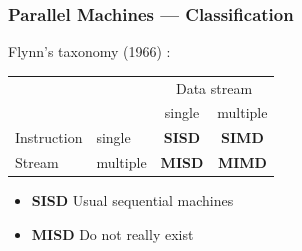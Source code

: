 \documentclass[xcolor={x11names,svgnames,psnames}]{beamer}
\begin{document}


\begin{frame}
\frametitle{Parallel Machines --- Classification}

\begin{block}{Flynn's taxonomy (1966) :}

  \begin{center}
    \begin{tabular}{|l|l|c|c|}
      \cline{3-4}
      \multicolumn{2}{c|}{}   & \multicolumn{2}{c|}{Data stream} \\
      \cline{3-4}
      \multicolumn{2}{c|}{}   & single & multiple \\
      \hline
      Instruction             & single   & \bf SISD   & \bf SIMD \\
      \cline{2-4}
      Stream                  & multiple   & \bf MISD   & \bf MIMD \\
      \hline
    \end{tabular}
  \end{center}
\end{block}

\pause
  \begin{itemize}

  \item {\bf SISD} Usual sequential machines

  \item {\bf MISD} Do not really exist
  \end{itemize}

\end{frame}
\end{document}
